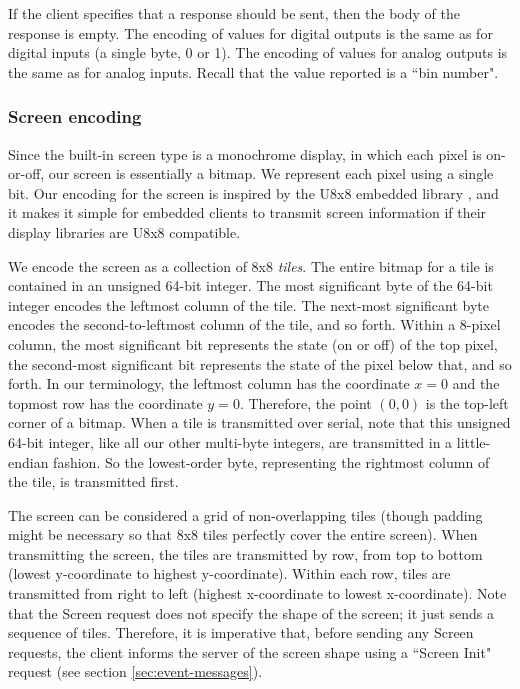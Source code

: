 \documentclass[12pt]{article}
\begin{document}
\begin{appendices}
If the client specifies that a response should be sent, then the body of the response is empty.  The encoding of values for digital outputs is the same as for digital inputs (a single byte, 0 or 1).  The encoding of values for analog outputs is the same as for analog inputs.  Recall that the value reported is a ``bin number".

\subsubsection{Screen encoding}
Since the built-in screen type is a monochrome display, in which each pixel is on-or-off, our screen is essentially a bitmap.  We represent each pixel using a single bit.  Our encoding for the screen is inspired by the U8x8 embedded library \cite{u8x8}, and it makes it simple for embedded clients to transmit screen information if their display libraries are U8x8 compatible.

We encode the screen as a collection of 8x8 \textit{tiles}.  The entire bitmap for a tile is contained in an unsigned 64-bit integer.  The most significant byte of the 64-bit integer encodes the leftmost column of the tile.  The next-most significant byte encodes the second-to-leftmost column of the tile, and so forth.  Within a 8-pixel column, the most significant bit represents the state (on or off) of the top pixel, the second-most significant bit represents the state of the pixel below that, and so forth.  In our terminology, the leftmost column has the coordinate $x=0$ and the topmost row has the coordinate $y=0$.  Therefore, the point $(0, 0)$ is the top-left corner of a bitmap.  When a tile is transmitted over serial, note that this unsigned 64-bit integer, like all our other multi-byte integers, are transmitted in a little-endian fashion.  So the lowest-order byte, representing the rightmost column of the tile, is transmitted first.

The screen can be considered a grid of non-overlapping tiles (though padding might be necessary so that 8x8 tiles perfectly cover the entire screen).  When transmitting the screen, the tiles are transmitted by row, from top to bottom (lowest y-coordinate to highest y-coordinate).  Within each row, tiles are transmitted from right to left (highest x-coordinate to lowest x-coordinate).  Note that the Screen request does not specify the shape of the screen; it just sends a sequence of tiles.  Therefore, it is imperative that, before sending any Screen requests, the client informs the server of the screen shape using a ``Screen Init" request (see section \ref{sec:event-messages}).


\end{appendices}
\end{document}

